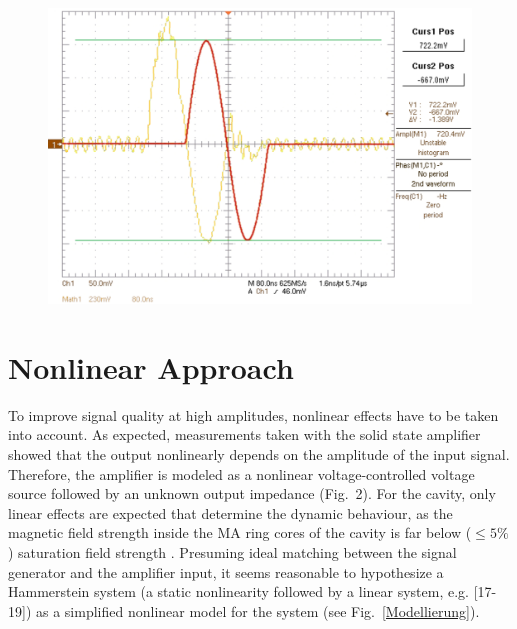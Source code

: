 \documentclass[a4paper,
               keeplastbox,%
               nospread%
              ]{jacow}
\begin{document}
	\begin{figure}[!h]
	\vspace{-0.5\baselineskip}
	\begin{center}
	 \includegraphics[scale=0.42]{WEPVA047f4.eps}
	  \label{Signal}
	\end{center}
	\vspace{-\baselineskip}
	\end{figure}
	
	
	\section{Nonlinear Approach}			
	To improve signal quality at high amplitudes, nonlinear effects have to be taken into account. As expected, measurements taken with the solid state amplifier
	showed that the output nonlinearly depends on the amplitude of the input signal. Therefore, the amplifier is modeled as a nonlinear voltage-controlled
	voltage source followed by an unknown output impedance (Fig.~2). For the cavity, only linear effects
	are expected that determine the dynamic behaviour, as the magnetic field strength inside the MA ring cores of the cavity is far below ($\le 5\%$) 
	saturation field strength \cite{VV_JH}. Presuming ideal matching between the signal generator and the amplifier input, it seems reasonable to hypothesize a Hammerstein
	system (a static nonlinearity followed by a linear system, e.g. [17-19]) as a simplified nonlinear model for the system %
	(see Fig.~\ref{Modellierung}).
	
\end{document}
